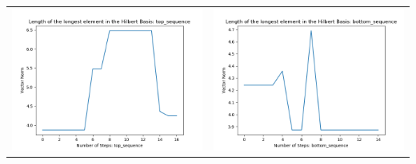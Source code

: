 \documentclass[10pt]{article}
\begin{document}
\begin{tabular}{c|c}
\begin{minipage}{.45\textwidth}
\includegraphics[width=\textwidth]{"DATA/4d/5 generators 2 bound D/top_sequence LENGTH"}
\end{minipage} &
\begin{minipage}{.45\textwidth}
\includegraphics[width=\textwidth]{"DATA/4d/5 generators 2 bound D bottomup/bottom_sequence LENGTH"}
\end{minipage}
\end{tabular}
\end{document}
